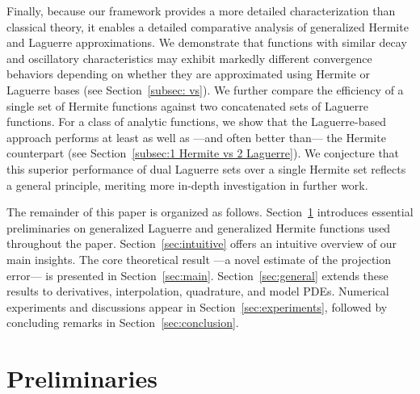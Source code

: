 \documentclass[pdflatex,sn-aps]{sn-jnl}%
\theoremstyle{thmstyleone}%
\theoremstyle{thmstyletwo}%
\theoremstyle{thmstylethree}%
\begin{document}
Finally, because our framework provides a more detailed characterization than classical theory, it enables a detailed comparative analysis of generalized Hermite and Laguerre approximations. We demonstrate that functions with similar decay and oscillatory characteristics may exhibit markedly different convergence behaviors depending on whether they are approximated using Hermite or Laguerre bases (see Section~\ref{subsec: vs}). We further compare the efficiency of a single set of Hermite functions against two concatenated sets of Laguerre functions. For a class of analytic functions, we show that the Laguerre-based approach performs at least as well as ---and often better than--- the Hermite counterpart (see Section~\ref{subsec:1 Hermite vs 2 Laguerre}).
We conjecture that this superior performance of dual Laguerre sets over a single Hermite set reflects a general principle, meriting more in-depth investigation in further work.


The remainder of this paper is organized as follows. Section~\ref{sec:basic} introduces essential preliminaries on generalized Laguerre and generalized Hermite functions used throughout the paper. Section~\ref{sec:intuitive}  offers an
intuitive overview of our main insights. The core theoretical result ---a novel estimate of the projection error--- is presented in Section~\ref{sec:main}.
Section~\ref{sec:general} extends these results to derivatives, interpolation, quadrature, and model PDEs. Numerical experiments and discussions appear in Section~\ref{sec:experiments}, followed by concluding remarks in Section~\ref{sec:conclusion}.

\section{Preliminaries}
\label{sec:basic}
\end{document}
